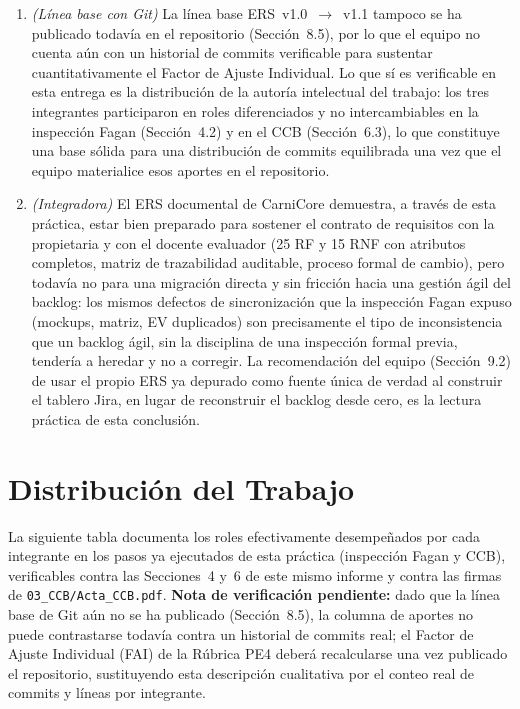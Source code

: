 \documentclass[11pt,a4paper]{article}
\begin{document}
\begin{enumerate}[nosep]
\item \textit{(Línea base con Git)} La línea base ERS~v1.0~$\to$~v1.1 tampoco se ha publicado todavía en el repositorio (Sección~8.5), por lo que el equipo no cuenta aún con un historial de commits verificable para sustentar cuantitativamente el Factor de Ajuste Individual. Lo que sí es verificable en esta entrega es la distribución de la autoría intelectual del trabajo: los tres integrantes participaron en roles diferenciados y no intercambiables en la inspección Fagan (Sección~4.2) y en el CCB (Sección~6.3), lo que constituye una base sólida para una distribución de commits equilibrada una vez que el equipo materialice esos aportes en el repositorio.
\item \textit{(Integradora)} El ERS documental de CarniCore demuestra, a través de esta práctica, estar bien preparado para sostener el contrato de requisitos con la propietaria y con el docente evaluador (25 RF y 15 RNF con atributos completos, matriz de trazabilidad auditable, proceso formal de cambio), pero todavía no para una migración directa y sin fricción hacia una gestión ágil del backlog: los mismos defectos de sincronización que la inspección Fagan expuso (mockups, matriz, EV duplicados) son precisamente el tipo de inconsistencia que un backlog ágil, sin la disciplina de una inspección formal previa, tendería a heredar y no a corregir. La recomendación del equipo (Sección~9.2) de usar el propio ERS ya depurado como fuente única de verdad al construir el tablero Jira, en lugar de reconstruir el backlog desde cero, es la lectura práctica de esta conclusión.
\end{enumerate}

\section{Distribución del Trabajo}
La siguiente tabla documenta los roles efectivamente desempeñados por cada integrante en los pasos ya ejecutados de esta práctica (inspección Fagan y CCB), verificables contra las Secciones~4 y~6 de este mismo informe y contra las firmas de \texttt{03\_CCB/Acta\_CCB.pdf}. \textbf{Nota de verificación pendiente:} dado que la línea base de Git aún no se ha publicado (Sección~8.5), la columna de aportes no puede contrastarse todavía contra un historial de commits real; el Factor de Ajuste Individual (FAI) de la Rúbrica PE4 deberá recalcularse una vez publicado el repositorio, sustituyendo esta descripción cualitativa por el conteo real de commits y líneas por integrante.
\end{document}
